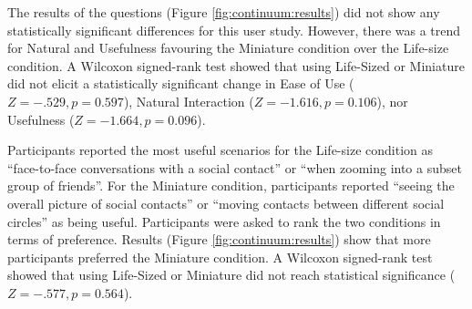 The results of the questions (Figure \ref{fig:continuum:results}) did not show any statistically significant differences for this user study. However, there was a trend for Natural and Usefulness favouring the Miniature condition over the Life-size condition. A Wilcoxon signed-rank test showed that using Life-Sized or Miniature did not elicit a statistically significant change in Ease of Use ($Z=-.529, p=0.597$), Natural Interaction ($Z=-1.616, p=0.106$), nor Usefulness ($Z=-1.664, p=0.096$). 

Participants reported the most useful scenarios for the Life-size condition as \enquote{face-to-face conversations with a social contact} or \enquote{when zooming into a subset group of friends}. For the Miniature condition, participants reported \enquote{seeing the overall picture of social contacts} or \enquote{moving contacts between different social circles} as being useful. Participants were asked to rank the two conditions in terms of preference. Results (Figure \ref{fig:continuum:results}) show that more participants preferred the Miniature condition. A Wilcoxon signed-rank test showed that using Life-Sized or Miniature did not reach statistical significance ($Z=-.577, p=0.564$).

